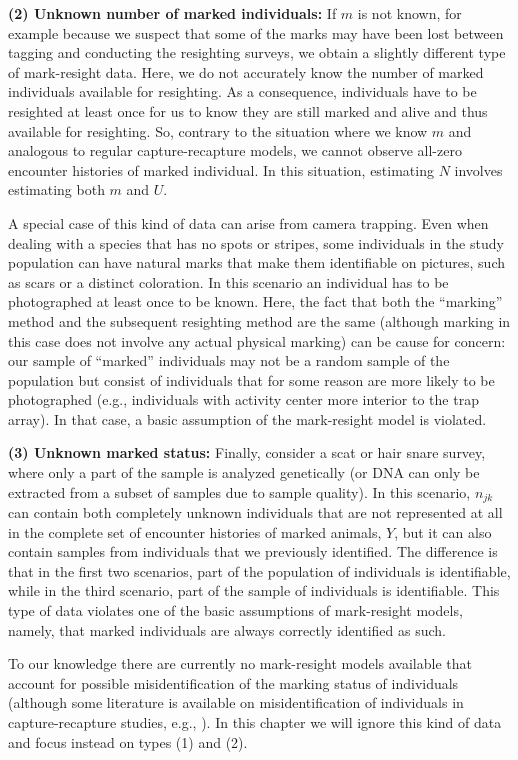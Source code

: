 {\flushleft \bf (2) Unknown number of marked individuals:} If $m$ is
not known, for example because we suspect that some of the marks may
have been lost between tagging and conducting the resighting surveys,
we obtain a slightly different type of mark-resight data. Here, we do
not accurately know the number of marked individuals available for
resighting. As a consequence, individuals have to be resighted at
least once for us to know they are still marked and alive and thus
available for resighting. So, contrary to the situation where we know
$m$ and analogous to regular capture-recapture models, we cannot
observe all-zero encounter histories of marked individual. In this
situation, estimating $N$ involves estimating both $m$ and $U$.

A special case of this kind of data can arise from camera
trapping. Even when dealing with a species that has no spots or
stripes, some individuals in the study population can have natural
marks that make them identifiable on pictures, such as scars or a
distinct coloration. In this scenario an individual has to be
photographed at least once to be known. Here, the fact that both the
``marking'' method and the subsequent resighting method are the same
(although marking in this case does not involve any actual physical
marking) can be cause for concern: our sample of ``marked''
individuals may not be a random sample of the population but consist
of individuals that for some reason are more likely to be
photographed (e.g., individuals with activity center more interior to
the trap array). In that case, a basic assumption of the mark-resight
model is violated.

{\flushleft \bf (3) Unknown marked status:} Finally, consider a scat
or hair snare survey, where only a part of the sample is analyzed
genetically (or DNA can only be extracted from a subset of samples due
to sample quality). In this scenario, $n_{jk}$ can contain both
completely unknown individuals that are not represented at all in the
complete set of encounter histories of marked animals, {\bf $Y$}, but
it can also contain samples from individuals that we previously
identified. The difference is that in the first two scenarios, part of
the population of individuals is identifiable, while in the third
scenario, part of the sample of individuals is identifiable. This type
of data violates one of the basic assumptions of mark-resight models,
namely, that marked individuals are always correctly identified as
such.

To our knowledge there are currently no mark-resight models available
that account for possible misidentification of the marking status of
individuals (although some literature is available on
misidentification of individuals in capture-recapture studies, e.g.,
\citealp{yoshizaki_etal:2009, lukacs_burnham:2005,
  link_etal:2010}). In this chapter we will ignore this kind of data
and focus instead on types (1) and (2).

